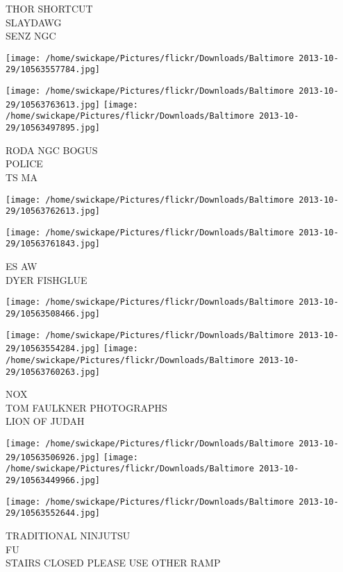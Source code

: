\documentclass[10pt,letterpaper]{article}
\begin{document}
THOR SHORTCUT\\
SLAYDAWG\\
SENZ NGC\\
\pagebreak

\texttt{[image: /home/swickape/Pictures/flickr/Downloads/Baltimore 2013-10-29/10563557784.jpg]}

\vspace{0.25in}
\texttt{[image: /home/swickape/Pictures/flickr/Downloads/Baltimore 2013-10-29/10563763613.jpg]}
\texttt{[image: /home/swickape/Pictures/flickr/Downloads/Baltimore 2013-10-29/10563497895.jpg]}

RODA NGC BOGUS\\
POLICE\\
TS MA\\
\pagebreak

\texttt{[image: /home/swickape/Pictures/flickr/Downloads/Baltimore 2013-10-29/10563762613.jpg]}

\vspace{0.25in}
\texttt{[image: /home/swickape/Pictures/flickr/Downloads/Baltimore 2013-10-29/10563761843.jpg]}

ES AW\\
DYER FISHGLUE\\
\pagebreak

\texttt{[image: /home/swickape/Pictures/flickr/Downloads/Baltimore 2013-10-29/10563508466.jpg]}

\vspace{0.25in}
\texttt{[image: /home/swickape/Pictures/flickr/Downloads/Baltimore 2013-10-29/10563554284.jpg]}
\texttt{[image: /home/swickape/Pictures/flickr/Downloads/Baltimore 2013-10-29/10563760263.jpg]}

NOX\\
TOM FAULKNER PHOTOGRAPHS\\
LION OF JUDAH\\
\pagebreak

\texttt{[image: /home/swickape/Pictures/flickr/Downloads/Baltimore 2013-10-29/10563506926.jpg]}
\texttt{[image: /home/swickape/Pictures/flickr/Downloads/Baltimore 2013-10-29/10563449966.jpg]}

\texttt{[image: /home/swickape/Pictures/flickr/Downloads/Baltimore 2013-10-29/10563552644.jpg]}

TRADITIONAL NINJUTSU\\
FU\\
STAIRS CLOSED PLEASE USE OTHER RAMP\\
\pagebreak
\end{document}
